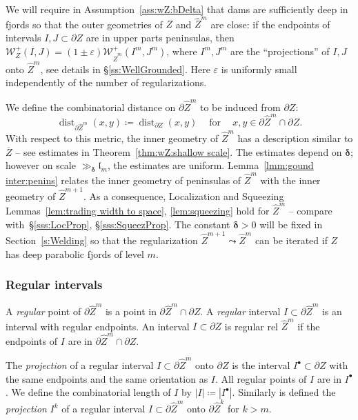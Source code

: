 \documentclass{amsart}
\renewcommand{\sp}{{\ \ }}
\newcommand{\1}{{\mathbb 1 }}
\newcommand{\Width}{{\mathcal W}}
\newcommand{\wZ}{{\widehat Z}}
\newcommand{\length}{{\mathfrak l}}
\theoremstyle{remark}
\numberwithin{equation}{section}
\theoremstyle{definition}
\newcommand{\dist}{\operatorname{dist}}
\newcommand{\bdelta}{{\boldsymbol{ \delta}}}
\begin{document}
We will require in Assumption~\ref{ass:wZ:bDelta} that dams are sufficiently deep in fjords so that the outer geometries of $Z$ and $\wZ^m$ are close: if the endpoints of intervals $I,J\subset \partial Z$ are in upper parts peninsulas, then $\Width_Z^+(I,J)=(1\pm\varepsilon)\Width^+_{\wZ^m}(I^m,J^m)$, where $I^m, J^m$ are the ``projections'' of $I,J$ onto $\wZ^m$, see details in \S\ref{ss:WellGrounded}. Here $\varepsilon$ is uniformly small independently of the number of regularizations.




We define the combinatorial distance on $\partial \wZ^m$ to be induced from $\partial Z$: 
\begin{equation}
\label{eq:dist on wZ^m}
\dist_{\partial \wZ^m} (x,y)\coloneqq \dist_{\partial Z} (x,y) \sp\sp\text{ for }\sp\sp x,y\in \partial \wZ^m \cap \partial Z.
\end{equation} With respect to this metric, the inner geometry of $\wZ^m$ has a description similar to $\overline Z$ -- see estimates in Theorem~\ref{thm:wZ:shallow scale}. The estimates depend on $\bdelta$; however on scale $\gg_\bdelta \length_{m}$, the estimates are uniform. Lemma~\ref{lmm:gound inter:penins} relates the inner geometry of peninsulas of $\wZ^m$ with the inner geometry of $\wZ^{m+1}$. As a consequence, Localization and Squeezing Lemmas~\ref{lem:trading  width to space}, \ref{lem:squeezing} hold for $\wZ^m$ -- compare with~\S\ref{sss:LocProp}, \S\ref{sss:SqueezProp}. The constant $\bdelta>0$ will be fixed in Section~\ref{s:Welding} so that the regularization $\wZ^{m+1}\leadsto \wZ^m$ can be iterated if $Z$ has deep parabolic fjords of level $m$. 



\subsubsection{Regular intervals}
\label{sss:reg interv}
A \emph{regular} point of $\partial \widehat Z^m$ is a point in $\partial \widehat Z^m\cap \partial Z$. A \emph{regular} interval $I\subset \partial \widehat Z^m$ is an interval with regular endpoints. An interval $I\subset \partial Z$ is regular rel $\wZ^m$ if the endpoints of $I$ are in $\partial \wZ^m\cap \partial Z$.

The \emph{projection} of a regular interval $I\subset \partial \widehat Z^m$ onto $\partial Z$ is the interval $I^\bullet\subset \partial Z$ with the same endpoints and the same orientation as $I$.  All regular points of $I$ are in $I^\bullet$. We define the combinatorial length of $I$ by $|I|\coloneqq  |I^\bullet|$. Similarly is defined the \emph{projection} $I^k$ of a regular interval $I\subset\partial \wZ^m$ onto $\partial \widehat Z^k$ for $k>m$. 
\end{document}
